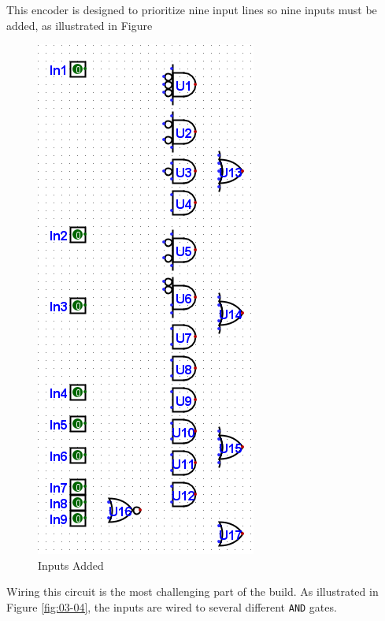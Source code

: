 This encoder is designed to prioritize nine input lines so nine inputs must be added, as illustrated in Figure 

\begin{figure}[H]
	\centering
	\includegraphics[width=\maxwidth{.95\linewidth}]{gfx/03-03}
	\caption{Inputs Added}
	\label{fig:03-03}
\end{figure}

Wiring this circuit is the most challenging part of the build. As illustrated in Figure \ref{fig:03-04}, the inputs are wired to several different \texttt{AND} gates.

